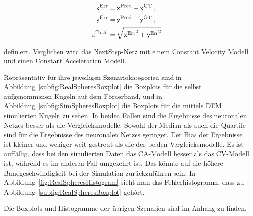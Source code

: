 \begin{align*}
    \mathsf{x}{^{\text{Err}}} &=  \mathsf{x}{^{\text{Pred}}} -  \mathsf{x}{^{\text{GT}}} \: ,\\
    \mathsf{y}{^{\text{Err}}} &=  \mathsf{y}{^{\text{Pred}}} -  \mathsf{y}{^{\text{GT}}} \: ,\\
    \varepsilon{^{\text{Total}}} &= \sqrt{ \mathsf{x}{^{\text{Err}}}^2 +  \mathsf{y}{^{\text{Err}}}^2}
\end{align*}

definiert. Verglichen wird das NextStep-Netz mit einem Constant Velocity Modell und einen Constant Acceleration Modell.

Repräsentativ für ihre jeweiligen Szenariokategorien sind in Abbildung~\ref{subfig:RealSpheresBoxplot} die Boxplots für die selbst aufgenommenen Kugeln auf dem Förderband,
und in Abbildung~\ref{subfig:SimSpheresBoxplot} die Boxplots für die mittels DEM simulierten Kugeln zu sehen.
In beiden Fällen sind die Ergebnisse des neuronalen Netzes besser als die Vergleichsmodelle.
Sowohl der Median als auch die Quartile sind für die Ergebnisse des neuronalen Netzes geringer.
Der Bias der Ergebnisse ist kleiner und weniger weit gestreut als die der beiden Vergleichsmodelle.
Es ist auffällig, dass bei den simulierten Daten das CA-Modell besser als das CV-Modell ist, während es im anderen Fall umgekehrt ist.
Das könnte auf die höhere Bandgeschwindigkeit bei der Simulation zurückzuführen sein. 
In Abbildung~\ref{fig:RealSpheresHistogram} sieht man das Fehlerhistogramm, dass zu Abbildung~\ref{subfig:RealSpheresBoxplot} gehört.




Die Boxplots und Histogramme der übrigen Szenarien sind im Anhang zu finden.

